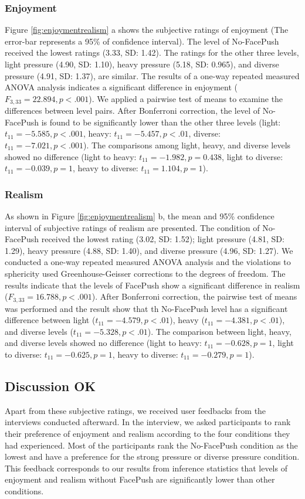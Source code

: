 \subsubsection{Enjoyment}
Figure \ref{fig:enjoymentrealism} a shows the subjective ratings of enjoyment (The error-bar represents a 95\% of confidence interval). The level of No-FacePush received the lowest ratings (3.33, SD: 1.42). The ratings for the other three levels, light pressure (4.90, SD: 1.10), heavy pressure (5.18, SD: 0.965), and diverse pressure (4.91, SD: 1.37), are similar. The results of a one-way repeated measured ANOVA analysis indicates a significant difference in enjoyment ($F_{3, 33} = 22.894, p < .001$). We applied a pairwise test of means to examine the differences between level pairs. After Bonferroni correction, the level of No-FacePush is found to be significantly lower than the other three levels (light: $t_{11} = -5.585, p < .001$, heavy: $t_{11} = -5.457, p < .01$, diverse: $t_{11} = -7.021, p < .001$). The comparisons among light, heavy, and diverse levels showed no difference (light to heavy: $t_{11} = -1.982, p = 0.438$, light to diverse: $t_{11} = -0.039, p = 1$, heavy to diverse: $t_{11} = 1.104, p = 1$).

\subsubsection{Realism}
As shown in Figure \ref{fig:enjoymentrealism} b, the mean and 95\% confidence interval of subjective ratings of realism are presented. The condition of No-FacePush received the lowest rating (3.02, SD: 1.52); light pressure (4.81, SD: 1.29), heavy pressure (4.88, SD: 1.40), and diverse pressure (4.96, SD: 1.27). We conducted a one-way repeated measured ANOVA analysis and the violations to sphericity used Greenhouse-Geisser corrections to the degrees of freedom. The results indicate that the levels of FacePush show a significant difference in realism ($F_{3, 33} = 16.788, p < .001$). After Bonferroni correction, the pairwise test of means was performed and the result show that th No-FacePush level has a significant difference between light ($t_{11} = -4.579, p < .01$), heavy ($t_{11} = -4.381, p < .01$), and diverse levels ($t_{11} = -5.328, p < .01$). The comparison between light, heavy, and diverse levels showed no difference (light to heavy: $t_{11} = -0.628, p = 1$, light to diverse: $t_{11} = -0.625, p = 1$, heavy to diverse: $t_{11} = -0.279, p = 1$).

\subsection{Discussion OK}
Apart from these subjective ratings, we received user feedbacks from the interviews conducted afterward. In the interview, we asked participants to rank their preference of enjoyment and realism according to the four conditions they had experienced. Most of the participants rank the No-FacePush condition as the lowest and have a preference for the strong pressure or diverse pressure condition. This feedback corresponds to our results from inference statistics that levels of enjoyment and realism without FacePush are significantly lower than other conditions.

